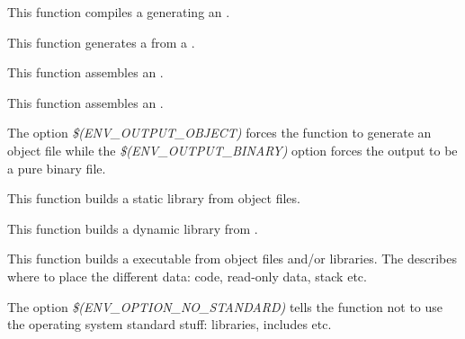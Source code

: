          {
	   This function compiles a  generating an
	   .
	 }

         {
	   This function generates a  from a
	   .
	 }

         {
	   This function assembles an .
	 }

         {
	   This function assembles an .

	   \-

	   The option \textit{\$(ENV\_OUTPUT\_OBJECT)} forces the function
	   to generate an object file while the
	   \textit{\$(ENV\_OUTPUT\_BINARY)} option forces the output to be
	   a pure binary file.
	 }

         {
	   This function builds a static library from object files.
	 }

         {
	   This function builds a dynamic library from .
	 }

         {
	   This function builds a executable from object files and/or
	   libraries. The  describes where to
	   place the different data: code, read-only data, stack etc.

	   \-

	   The option \textit{\$(ENV\_OPTION\_NO\_STANDARD)} tells the function
	   not to use the operating system standard stuff: libraries, includes
	   etc.
	 }

